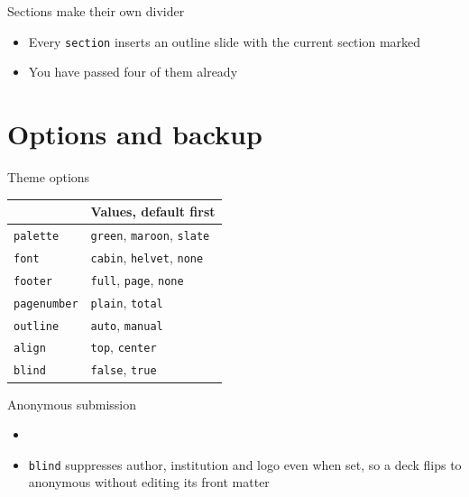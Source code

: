 \documentclass[11pt,aspectratio=43]{beamer}
\newcommand{\howto}[1]{}
\begin{document}
\begin{frame}{Sections make their own divider}
  \begin{itemize}
    \item Every \texttt{section} inserts an outline slide with the current section marked
    \item You have passed four of them already
  \end{itemize}
  \howto{sections}
\end{frame}

\section{Options and backup}

\begin{frame}{Theme options}
  \begin{lucidtable}
    \begin{tabular}{@{}ll@{}}
      \toprule
      \thead{Option & Values, default first} \\
      \midrule
      \texttt{palette}    & \texttt{green}, \texttt{maroon}, \texttt{slate} \\
      \texttt{font}       & \texttt{cabin}, \texttt{helvet}, \texttt{none} \\
      \texttt{footer}     & \texttt{full}, \texttt{page}, \texttt{none} \\
      \texttt{pagenumber} & \texttt{plain}, \texttt{total} \\
      \texttt{outline}    & \texttt{auto}, \texttt{manual} \\
      \texttt{align}      & \texttt{top}, \texttt{center} \\
      \texttt{blind}      & \texttt{false}, \texttt{true} \\
      \bottomrule
    \end{tabular}
  \end{lucidtable}
  \howto{options}
\end{frame}

\begin{frame}{Anonymous submission}
  \begin{itemize}
    \item {}
    \item \texttt{blind} suppresses author, institution and logo even when set, so a
      deck flips to anonymous without editing its front matter
  \end{itemize}
  \howto{blind}
\end{frame}
\end{document}
